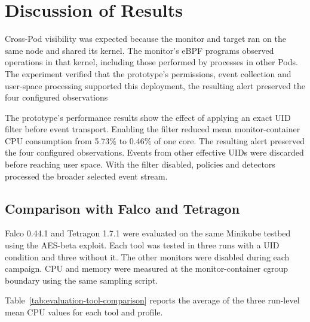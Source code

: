 \section{Discussion of Results}
  \label{sec:evaluation-discussion}

  Cross-Pod visibility was expected because the monitor and target ran on
  the same node and shared its kernel. The monitor's eBPF programs observed
  operations in that kernel, including those performed by processes in other
  Pods. The experiment verified that the prototype's permissions, event
  collection and user-space processing supported this deployment, the resulting
  alert preserved the four configured observations

  The prototype's performance results show the effect of applying an exact
  UID filter before event transport. Enabling the filter reduced mean
  monitor-container CPU consumption from 5.73\% to 0.46\% of one core. 
  The resulting alert preserved the four configured observations. 
  Events from other effective UIDs were discarded before reaching user space. 
  With the filter disabled, policies and detectors processed the broader selected event stream.

  \subsection{Comparison with Falco and Tetragon}
  \label{subsec:evaluation-tool-comparison}

  Falco 0.44.1 and Tetragon 1.7.1 were evaluated on the same Minikube testbed
  using the AES-beta exploit. Each tool was tested in three runs with a UID
  condition and three without it.
  The other monitors were disabled during each campaign. CPU and memory were
  measured at the monitor-container cgroup boundary using the same sampling
  script.

  Table~\ref{tab:evaluation-tool-comparison} reports the average of the
  three run-level mean CPU values for each tool and profile.

